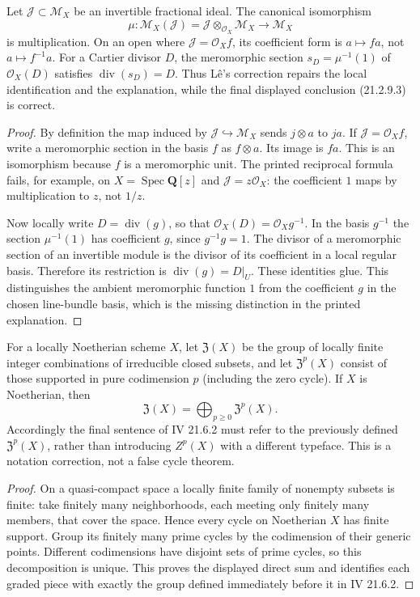 \begin{proposition}\label{SA23-D-15}
Let $\mathcal J\subset\mathcal M_X$ be an invertible
fractional ideal.  The canonical isomorphism
\[
 \mu:\mathcal M_X(\mathcal J)
 =\mathcal J\otimes_{\mathcal O_X}\mathcal M_X
 \longrightarrow\mathcal M_X
\]
is multiplication.  On an open where
$\mathcal J=\mathcal O_X f$, its coefficient form is
$a\mapsto fa$, not $a\mapsto f^{-1}a$.
For a Cartier divisor $D$, the meromorphic section
$s_D=\mu^{-1}(1)$ of $\mathcal O_X(D)$ satisfies
$\operatorname{div}(s_D)=D$.
Thus L\^e's correction repairs the local identification
and the explanation, while the final displayed conclusion
(21.2.9.3) is correct.
\end{proposition}
\begin{proof}
By definition the map induced by
$\mathcal J\hookrightarrow\mathcal M_X$ sends
$j\otimes a$ to $ja$.
If $\mathcal J=\mathcal O_X f$, write a meromorphic
section in the basis $f$ as $f\otimes a$.
Its image is $fa$.  This is an isomorphism because
$f$ is a meromorphic unit.
The printed reciprocal formula fails, for example, on
$X=\operatorname{Spec}\mathbf Q[z]$ and
$\mathcal J=z\mathcal O_X$: the coefficient $1$
maps by multiplication to $z$, not $1/z$.

Now locally write $D=\operatorname{div}(g)$, so that
$\mathcal O_X(D)=\mathcal O_Xg^{-1}$.
In the basis $g^{-1}$ the section $\mu^{-1}(1)$
has coefficient $g$, since $g^{-1}g=1$.
The divisor of a meromorphic section of an invertible
module is the divisor of its coefficient in a local
regular basis.  Therefore its restriction is
$\operatorname{div}(g)=D|_U$.  These identities glue.
This distinguishes the ambient meromorphic function $1$
from the coefficient $g$ in the chosen line-bundle basis,
which is the missing distinction in the printed explanation.
\end{proof}

\begin{proposition}\label{SA23-D-16}
For a locally Noetherian scheme $X$, let
$\mathfrak Z(X)$ be the group of locally finite integer
combinations of irreducible closed subsets, and let
$\mathfrak Z^p(X)$ consist of those supported in pure
codimension $p$ (including the zero cycle).
If $X$ is Noetherian, then
\[
 \mathfrak Z(X)=\bigoplus_{p\geq0}\mathfrak Z^p(X).
\]
Accordingly the final sentence of IV 21.6.2 must refer
to the previously defined $\mathfrak Z^p(X)$, rather than
introducing $Z^p(X)$ with a different typeface.
This is a notation correction, not a false cycle theorem.
\end{proposition}
\begin{proof}
On a quasi-compact space a locally finite family of
nonempty subsets is finite: take finitely many
neighborhoods, each meeting only finitely many members,
that cover the space.  Hence every cycle on Noetherian
$X$ has finite support.  Group its finitely many prime
cycles by the codimension of their generic points.
Different codimensions have disjoint sets of prime
cycles, so this decomposition is unique.  This proves
the displayed direct sum and identifies each graded
piece with exactly the group defined immediately
before it in IV 21.6.2.
\end{proof}
